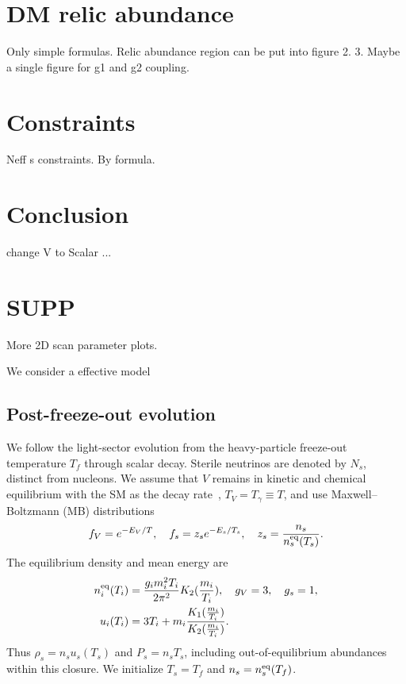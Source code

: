 \documentclass[prd,showpacs,preprintnumbers,amsmath,amssymb,twocolumn,
superscriptaddress,notitlepage]{revtex4-2}
\begin{document}
\section{DM relic abundance}

Only simple formulas. Relic abundance region can be put into figure 2.
3. Maybe a single figure for g1 and g2 coupling.




\section{Constraints}

Neff s constraints. By formula.

\section{Conclusion}

change V to Scalar ...


\section{SUPP}

More 2D scan parameter plots.

We consider a effective model 

\subsection{Post-freeze-out evolution}

We follow the light-sector evolution from the heavy-particle
freeze-out temperature $T_f$ through scalar decay. Sterile
neutrinos are denoted by $N_s$, distinct from nucleons.
We assume that $V$ remains in kinetic and chemical equilibrium
with the SM as the decay rate~\cite{Ilten:2018crw}, $T_V=T_\gamma\equiv T$, and use Maxwell--Boltzmann
(MB) distributions
\[
f_V=e^{-E_V/T},
\quad
f_s=z_s e^{-E_s/T_s},
\quad
z_s=\frac{n_s}{n_s^{\rm eq}(T_s)}.
\]
The equilibrium density and mean energy are
\cite{EscuderoAbenza:2020cmq,Cirelli:2024ssz}
\begin{align}
n_i^{\rm eq}(T_i)
&=\frac{g_i m_i^2T_i}{2\pi^2}K_2(\frac{m_i}{T_i}),
\quad g_V=3,\quad g_s=1,
\\
u_i(T_i)
&=3T_i+m_i\frac{K_1(\frac{m_i}{T_i})}{K_2(\frac{m_i}{T_i})}.
\end{align}
Thus $\rho_s=n_su_s(T_s)$ and $P_s=n_sT_s$, including
out-of-equilibrium abundances within this closure.
We initialize $T_s=T_f$ and $n_s=n_s^{\rm eq}(T_f)$.
\end{document}
